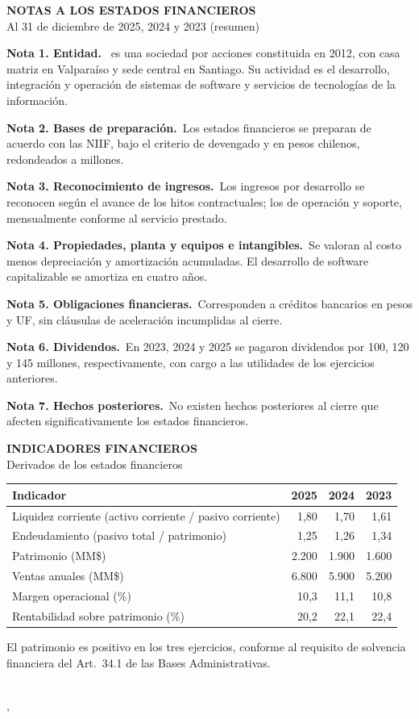 \documentclass[11pt]{article}
\newcommand{\nota}[2]{\par\medskip\noindent\textbf{#1}\ #2}
\begin{document}
\vspace{10pt}
\clearpage

\begin{center}{\large\bfseries NOTAS A LOS ESTADOS FINANCIEROS}\\[2pt]Al 31 de diciembre de 2025, 2024 y 2023 (resumen)\end{center}
\nota{Nota 1. Entidad.}{\LFXempresa{} es una sociedad por acciones constituida en 2012, con casa matriz en Valparaíso y sede central en Santiago. Su actividad es el desarrollo, integración y operación de sistemas de software y servicios de tecnologías de la información.}
\nota{Nota 2. Bases de preparación.}{Los estados financieros se preparan de acuerdo con las NIIF, bajo el criterio de devengado y en pesos chilenos, redondeados a millones.}
\nota{Nota 3. Reconocimiento de ingresos.}{Los ingresos por desarrollo se reconocen según el avance de los hitos contractuales; los de operación y soporte, mensualmente conforme al servicio prestado.}
\nota{Nota 4. Propiedades, planta y equipos e intangibles.}{Se valoran al costo menos depreciación y amortización acumuladas. El desarrollo de software capitalizable se amortiza en cuatro años.}
\nota{Nota 5. Obligaciones financieras.}{Corresponden a créditos bancarios en pesos y UF, sin cláusulas de aceleración incumplidas al cierre.}
\nota{Nota 6. Dividendos.}{En 2023, 2024 y 2025 se pagaron dividendos por 100, 120 y 145 millones, respectivamente, con cargo a las utilidades de los ejercicios anteriores.}
\nota{Nota 7. Hechos posteriores.}{No existen hechos posteriores al cierre que afecten significativamente los estados financieros.}
\clearpage

\begin{center}{\large\bfseries INDICADORES FINANCIEROS}\\[2pt]Derivados de los estados financieros\end{center}
\noindent\begin{tabularx}{\linewidth}{@{}X R R R@{}}
  \toprule \textbf{Indicador} & \textbf{2025} & \textbf{2024} & \textbf{2023}\\\midrule
  Liquidez corriente (activo corriente / pasivo corriente) & 1,80 & 1,70 & 1,61\\
  Endeudamiento (pasivo total / patrimonio) & 1,25 & 1,26 & 1,34\\
  Patrimonio (MM\$) & 2.200 & 1.900 & 1.600\\
  Ventas anuales (MM\$) & 6.800 & 5.900 & 5.200\\
  Margen operacional (\%) & 10,3 & 11,1 & 10,8\\
  Rentabilidad sobre patrimonio (\%) & 20,2 & 22,1 & 22,4\\
  \bottomrule
\end{tabularx}

\medskip
\noindent El patrimonio es positivo en los tres ejercicios, conforme al requisito de solvencia financiera del Art.~34.1 de las Bases Administrativas.

\vspace{30pt}
\noindent\SIMfecha\par\vspace{26pt}
\noindent\SIMfirmalinea{6cm}{0.5pt}\\
\LFXrepresentante, \LFXcargo\\\LFXempresa
\end{document}
